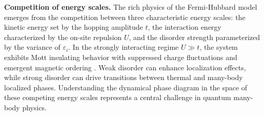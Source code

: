 \textbf{Competition of energy scales.} The rich physics of the Fermi-Hubbard model emerges from the competition between three characteristic energy scales: the kinetic energy set by the hopping amplitude $t$, the interaction energy characterized by the on-site repulsion $U$, and the disorder strength parameterized by the variance of $\varepsilon_i$. In the strongly interacting regime $U \gg t$, the system exhibits Mott insulating behavior with suppressed charge fluctuations and emergent magnetic ordering \cite{mazurenko_cold-atom_2017}. Weak disorder can enhance localization effects, while strong disorder can drive transitions between thermal and many-body localized phases. Understanding the dynamical phase diagram in the space of these competing energy scales represents a central challenge in quantum many-body physics.
